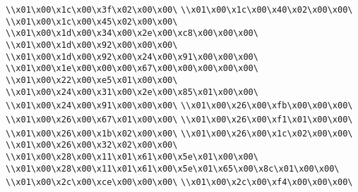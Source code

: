 \verb|\\x01\x00\x1c\x00\x3f\x02\x00\x00\|\newline
\verb|\\x01\x00\x1c\x00\x40\x02\x00\x00\|\newline
\verb|\\x01\x00\x1c\x00\x45\x02\x00\x00\|\newline
\verb|\\x01\x00\x1d\x00\x34\x00\x2e\x00\xc8\x00\x00\x00\|\newline
\verb|\\x01\x00\x1d\x00\x92\x00\x00\x00\|\newline
\verb|\\x01\x00\x1d\x00\x92\x00\x24\x00\x91\x00\x00\x00\|\newline
\verb|\\x01\x00\x1e\x00\x00\x00\x67\x00\x00\x00\x00\x00\|\newline
\verb|\\x01\x00\x22\x00\xe5\x01\x00\x00\|\newline
\verb|\\x01\x00\x24\x00\x31\x00\x2e\x00\x85\x01\x00\x00\|\newline
\verb|\\x01\x00\x24\x00\x91\x00\x00\x00\|\newline
\verb|\\x01\x00\x26\x00\xfb\x00\x00\x00\|\newline
\verb|\\x01\x00\x26\x00\x67\x01\x00\x00\|\newline
\verb|\\x01\x00\x26\x00\xf1\x01\x00\x00\|\newline
\verb|\\x01\x00\x26\x00\x1b\x02\x00\x00\|\newline
\verb|\\x01\x00\x26\x00\x1c\x02\x00\x00\|\newline
\verb|\\x01\x00\x26\x00\x32\x02\x00\x00\|\newline
\verb|\\x01\x00\x28\x00\x11\x01\x61\x00\x5e\x01\x00\x00\|\newline
\verb|\\x01\x00\x28\x00\x11\x01\x61\x00\x5e\x01\x65\x00\x8c\x01\x00\x00\|\newline
\verb|\\x01\x00\x2c\x00\xce\x00\x00\x00\|\newline
\verb|\\x01\x00\x2c\x00\xf4\x00\x00\x00\|\newline
